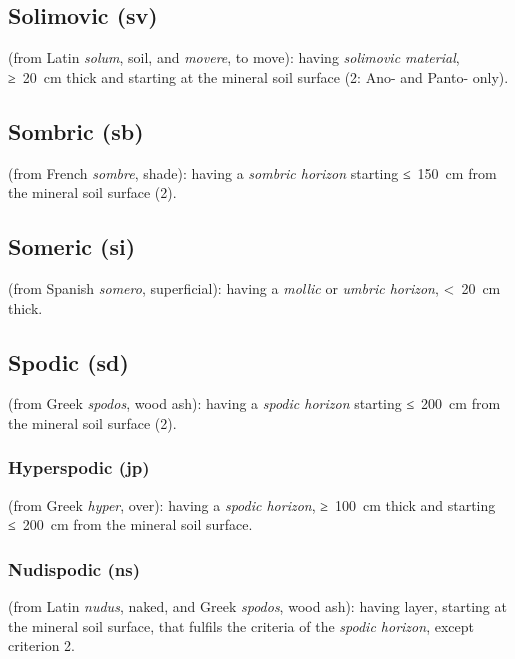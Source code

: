 \documentclass[
  letterpaper,
  DIV=11,
  numbers=noendperiod]{scrreprt}
\begin{document}
\hypertarget{solimovic-sv}{%
\subsection{Solimovic (sv)}\label{solimovic-sv}}

(from Latin \emph{solum}, soil, and \emph{movere}, to move): having
\emph{solimovic material}, ≥~20~cm thick and starting at the mineral
soil surface (2: Ano- and Panto- only).

\hypertarget{sombric-sb}{%
\subsection{Sombric (sb)}\label{sombric-sb}}

(from French \emph{sombre}, shade): having a \emph{sombric horizon}
starting ≤~150~cm from the mineral soil surface (2).

\hypertarget{someric-si}{%
\subsection{Someric (si)}\label{someric-si}}

(from Spanish \emph{somero}, superficial): having a \emph{mollic} or
\emph{umbric horizon}, \textless~20~cm thick.

\hypertarget{spodic-sd}{%
\subsection{Spodic (sd)}\label{spodic-sd}}

(from Greek \emph{spodos}, wood ash): having a \emph{spodic horizon}
starting ≤~200~cm from the mineral soil surface (2).

\hypertarget{hyperspodic-jp-1}{%
\subsubsection{Hyperspodic (jp)}\label{hyperspodic-jp-1}}

(from Greek \emph{hyper}, over): having a \emph{spodic horizon},
≥~100~cm thick and starting ≤~200~cm from the mineral soil surface.

\hypertarget{nudispodic-ns}{%
\subsubsection{Nudispodic (ns)}\label{nudispodic-ns}}

(from Latin \emph{nudus}, naked, and Greek \emph{spodos}, wood ash):
having layer, starting at the mineral soil surface, that fulfils the
criteria of the \emph{spodic horizon}, except criterion 2.
\end{document}
